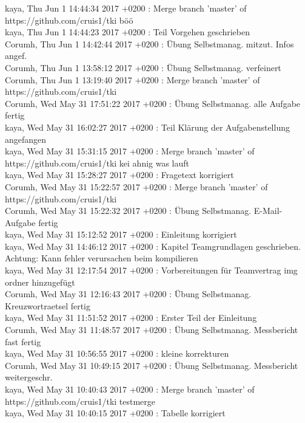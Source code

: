 kaya, Thu Jun 1 14:44:34 2017 +0200 : Merge branch 'master' of https://github.com/cruis1/tki böö \\
kaya, Thu Jun 1 14:44:23 2017 +0200 : Teil Vorgehen geschrieben \\
Corumh, Thu Jun 1 14:42:44 2017 +0200 : Übung Selbstmanag. mitzut. Infos angef. \\
Corumh, Thu Jun 1 13:58:12 2017 +0200 : Übung Selbstmanag. verfeinert \\
Corumh, Thu Jun 1 13:19:40 2017 +0200 : Merge branch 'master' of https://github.com/cruis1/tki \\
Corumh, Wed May 31 17:51:22 2017 +0200 : Übung Selbstmanag. alle Aufgabe fertig \\
kaya, Wed May 31 16:02:27 2017 +0200 : Teil Klärung der Aufgabenstellung angefangen \\
kaya, Wed May 31 15:31:15 2017 +0200 : Merge branch 'master' of https://github.com/cruis1/tki kei ahnig was lauft \\
kaya, Wed May 31 15:28:27 2017 +0200 : Fragetext korrigiert \\
Corumh, Wed May 31 15:22:57 2017 +0200 : Merge branch 'master' of https://github.com/cruis1/tki \\
Corumh, Wed May 31 15:22:32 2017 +0200 : Übung Selbstmanag. E-Mail-Aufgabe fertig \\
kaya, Wed May 31 15:12:52 2017 +0200 : Einleitung korrigiert \\
kaya, Wed May 31 14:46:12 2017 +0200 : Kapitel Teamgrundlagen geschrieben. Achtung: Kann fehler verursachen beim kompilieren \\
kaya, Wed May 31 12:17:54 2017 +0200 : Vorbereitungen für Teamvertrag img ordner hinzugefügt \\
Corumh, Wed May 31 12:16:43 2017 +0200 : Übung Selbstmanag. Kreuzwortraetsel fertig \\
kaya, Wed May 31 11:51:52 2017 +0200 : Erster Teil der Einleitung \\
Corumh, Wed May 31 11:48:57 2017 +0200 : Übung Selbstmanag. Messbericht fast fertig \\
kaya, Wed May 31 10:56:55 2017 +0200 : kleine korrekturen \\
Corumh, Wed May 31 10:49:15 2017 +0200 : Übung Selbstmanag. Messbericht weitergeschr. \\
kaya, Wed May 31 10:40:43 2017 +0200 : Merge branch 'master' of https://github.com/cruis1/tki testmerge \\
kaya, Wed May 31 10:40:15 2017 +0200 : Tabelle korrigiert \\

